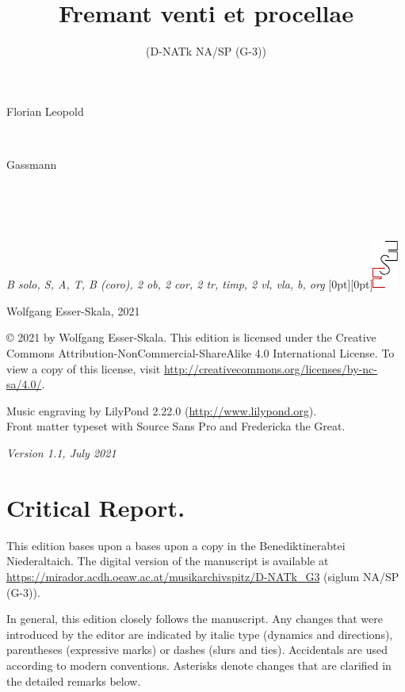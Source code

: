 \documentclass[parskip=full]{scrreprt}
\makeatletter
\DeclareRobustCommand{\sbseries}{\fontseries{sb}\selectfont}
\newcommand\fancytitlehead{
	\headingfont%
	\fontsize{80}{80}\selectfont\textcolor{black!80}{\@lastname.}\\[15pt]%
	\fontsize{60}{60}\selectfont\@ifundefined{@shorttitle}{\@title}{\@shorttitle}.%
}
\def\firstname#1{\def\@firstname{#1}}
\def\lastname#1{\def\@lastname{#1}}
\def\shorttitle#1{\def\@shorttitle{#1}}
\def\instrumentation#1{\def\@instrumentation{#1}}
\def\maketitle{%
\begin{titlepage}%
	\Large%
	{\@titlehead}%
	\vfill%
	{\strut\@firstname}\\%
	{\sbseries\color{oldred}\strut\@lastname}\\%
	{\strut\@namesuffix}%
	\vfill%
	{\sbseries\@title}\\%
	{\@subtitle}\\[\baselineskip]%
	{\itshape\@instrumentation}%
	\vfill%
	{\itshape\@parts}\hspace*{\fill}\raisebox{0pt}[0pt][0pt]{\includegraphics{ees_logo}}%
\end{titlepage}%
}
\newif\ifprintreport\printreportfalse
\makeatother
\begin{document}
\titlehead{\fancytitlehead}
\firstname{Florian Leopold}
\lastname{Gassmann}
\title{Fremant venti et procellae}
\shorttitle{Fremant venti}
\subtitle{(D-NATk NA/SP (G-3))}
\instrumentation{B solo, S, A, T, B (coro), 2 ob, 2 cor, 2 tr, timp, 2 vl, vla, b, org}
\maketitle


\thispagestyle{empty}

\vspace*{\fill}

\hspace*{1em}Wolfgang Esser-Skala, 2021

© 2021 by Wolfgang Esser-Skala. This edition is licensed under the Creative Commons Attribution-NonCommercial-ShareAlike 4.0 International License. To view a copy of this license, visit \url{http://creativecommons.org/licenses/by-nc-sa/4.0/}.

Music engraving by LilyPond 2.22.0 (\url{http://www.lilypond.org}).\\
Front matter typeset with Source Sans Pro and Fredericka the Great.

\textit{Version 1.1, July 2021}

\vspace*{2cm}

\ifprintreport
\chapter*{Critical Report.}

This edition bases upon a bases upon a copy in the Benediktinerabtei Niederaltaich. The digital version of the manuscript is available at \url{https://mirador.acdh.oeaw.ac.at/musikarchivspitz/D-NATk_G3} (siglum NA/SP (G-3)).

In general, this edition closely follows the manuscript. Any changes that were introduced by the editor are indicated by italic type (dynamics and directions), parentheses (expressive marks) or dashes (slurs and ties). Accidentals are used according to modern conventions. Asterisks denote changes that are clarified in the detailed remarks below.
\end{document}
